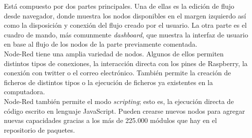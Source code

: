 Está compuesto por dos partes principales. Una de ellas es la edición de flujo desde navegador, donde muestra los nodos disponibles en el margen izquierdo así como la disposición y conexión del flujo creado por el usuario. La otra parte es el cuadro de mando, más comunmente \textit{dashboard}, que muestra la interfaz de usuario en base al flujo de los nodos de la parte previamente comentada.\\

Node-Red tiene una amplia variedad de nodos. Algunos de ellos permiten distintos tipos de conexiones, la interacción directa con los pines de Raspberry, la conexión con twitter o el correo electrónico. También permite la creación de ficheros de distintos tipos o la ejecución de ficheros ya existentes en la computadora.\\

Node-Red también permite el modo \textit{scripting}; esto es, la ejecución directa de código escrito en lenguaje JavaScript. Pueden crearse nuevos nodos para agregar nuevas capacidades gracias a los más de 225.000 módulos que hay en el repositorio de paquetes.\\

